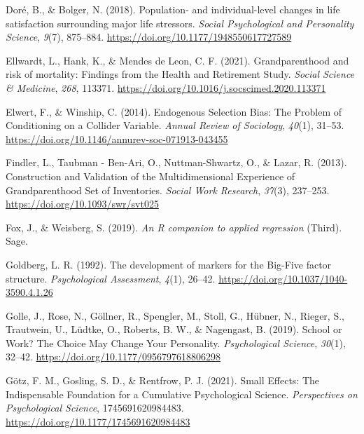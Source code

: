 \documentclass[
  english,
  man, noextraspace]{apa7}
\begin{document}
\leavevmode\hypertarget{ref-dorePopulationIndividuallevelChanges2018}{}%
Doré, B., \& Bolger, N. (2018). Population- and individual-level changes in life satisfaction surrounding major life stressors. \emph{Social Psychological and Personality Science}, \emph{9}(7), 875--884. \url{https://doi.org/10.1177/1948550617727589}

\leavevmode\hypertarget{ref-ellwardtGrandparenthoodRiskMortality2021}{}%
Ellwardt, L., Hank, K., \& Mendes de Leon, C. F. (2021). Grandparenthood and risk of mortality: Findings from the Health and Retirement Study. \emph{Social Science \& Medicine}, \emph{268}, 113371. \url{https://doi.org/10.1016/j.socscimed.2020.113371}

\leavevmode\hypertarget{ref-elwertEndogenousSelectionBias2014}{}%
Elwert, F., \& Winship, C. (2014). Endogenous Selection Bias: The Problem of Conditioning on a Collider Variable. \emph{Annual Review of Sociology}, \emph{40}(1), 31--53. \url{https://doi.org/10.1146/annurev-soc-071913-043455}

\leavevmode\hypertarget{ref-findlerConstructionValidationMultidimensional2013}{}%
Findler, L., Taubman - Ben-Ari, O., Nuttman-Shwartz, O., \& Lazar, R. (2013). Construction and Validation of the Multidimensional Experience of Grandparenthood Set of Inventories. \emph{Social Work Research}, \emph{37}(3), 237--253. \url{https://doi.org/10.1093/swr/svt025}

\leavevmode\hypertarget{ref-car2019}{}%
Fox, J., \& Weisberg, S. (2019). \emph{An R companion to applied regression} (Third). Sage.

\leavevmode\hypertarget{ref-goldbergDevelopmentMarkersBigFive1992}{}%
Goldberg, L. R. (1992). The development of markers for the Big-Five factor structure. \emph{Psychological Assessment}, \emph{4}(1), 26--42. \url{https://doi.org/10.1037/1040-3590.4.1.26}

\leavevmode\hypertarget{ref-golleSchoolWorkChoice2019}{}%
Golle, J., Rose, N., Göllner, R., Spengler, M., Stoll, G., Hübner, N., Rieger, S., Trautwein, U., Lüdtke, O., Roberts, B. W., \& Nagengast, B. (2019). School or Work? The Choice May Change Your Personality. \emph{Psychological Science}, \emph{30}(1), 32--42. \url{https://doi.org/10.1177/0956797618806298}

\leavevmode\hypertarget{ref-gotzSmallEffectsIndispensable2021}{}%
Götz, F. M., Gosling, S. D., \& Rentfrow, P. J. (2021). Small Effects: The Indispensable Foundation for a Cumulative Psychological Science. \emph{Perspectives on Psychological Science}, 1745691620984483. \url{https://doi.org/10.1177/1745691620984483}
\end{document}
